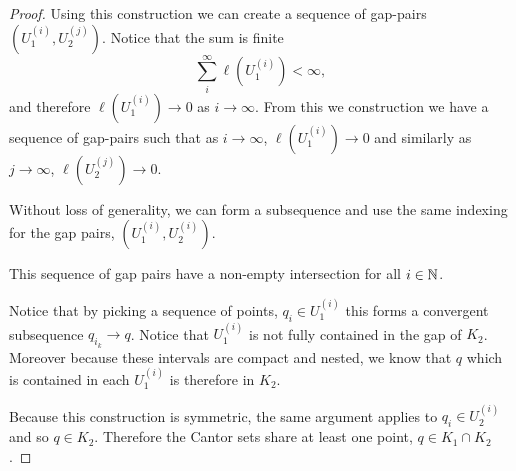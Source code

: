 \begin{proof}
    Using this construction we can create a sequence of gap-pairs $(U_1^{(i)}, U_2^{(j)})$.  Notice that the sum is finite $$\sum_i^\infty \ell(U_1^{(i)}) < \infty,$$ and therefore $\ell(U_1^{(i)}) \to 0$ as $i \to \infty$.   From this we construction we have a sequence of gap-pairs such that as $i \to \infty$, $\ell(U_1^{(i)}) \to 0$ and similarly as $j \to \infty$, $\ell(U_2^{(j)}) \to 0$.  
    
    Without loss of generality, we can form a subsequence and use the same indexing for the gap pairs, $(U_1^{(i)}, U_2^{(i)})$.  
    
    This sequence of gap pairs have a non-empty intersection for all $i \in \mathbb{N}$.  

    Notice that by picking a sequence of points, $q_{i} \in U_1^{(i)}$ this forms a convergent subsequence $q_{i_k} \to q$.  Notice that $U_1^{(i)}$ 
    is not fully contained in the gap of $K_2$.  Moreover because these intervals are compact and nested, we know that %
     $q$ which is contained in each $U_1^{(i)}$ is therefore in  $K_2$.  

    Because this construction is symmetric, the same argument applies to $q_{i} \in U_2^{(i)}$ and so $q \in K_2$.  Therefore the Cantor sets share at least one point, $q \in K_1 \cap K_2$.  

\end{proof}